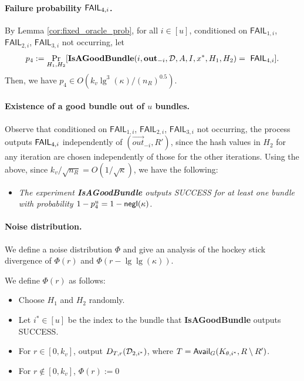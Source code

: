 \paragraph{Failure probability $\mathsf{FAIL}_{4,i}$.}
By Lemma \ref{cor:fixed_oracle_prob},
for all $i \in [u]$, 
conditioned on $\mathsf{FAIL}_{1,i}$, $\mathsf{FAIL}_{2,i}$, $\mathsf{FAIL}_{3,i}$ not occurring, let
\[
p_4 := \Pr_{H_1, H_2}[\textbf{IsAGoodBundle}(i, \mathbf{out}_{-i}, {\cal D}, A,
I, {x^*}, H_1, H_2)  =\  \mathsf{FAIL}_{4,i}]. \] 
Then, we have $p_4 \in O(k_v \lg^3(\kappa)/(n_R)^{0.5})$.

\paragraph{Existence of a good bundle out of $u$ bundles.}
Observe that conditioned on $\mathsf{FAIL}_{1,i}$,
$\mathsf{FAIL}_{2,i}$, $\mathsf{FAIL}_{3,i}$ not occurring, the process
outputs $\mathsf{FAIL}_{4,i}$ independently of $(\vec{out}_{-i}, R')$, since the
hash values in $H_2$ for any iteration are chosen independently of those
for the other iterations.
%
Using the above, since $k_v /\sqrt{n_R} = O(1/\sqrt{\kappa})$, we have the following:


\begin{itemize}
\item[] \it
The experiment {\bf IsAGoodBundle} outputs SUCCESS for at least one bundle with probability $1 - p_4^u = 1 - \mathsf{negl}(\kappa)$.
\end{itemize}

\paragraph{Noise distribution.}
We define a noise distribution
$\Phi$ and give an analysis of the hockey stick divergence of $\Phi(r)$ and $\Phi(r-\lg\lg(\kappa))$.

\begin{definition}
We define $\Phi(r)$ as follows:
\begin{itemize}
    \item Choose $H_1$ and $H_2$ randomly.  
    \item Let $i^* \in [u]$ be the index to the bundle that {\bf IsAGoodBundle} outputs SUCCESS.
    \item For $r \in [0, k_v]$,  output $D_{T, r}({\cal D}_{2,i^*})$, where $T = \mathsf{Avail}_G(K_{\theta, i^*}, R \setminus R')$.
    \item For $r \not \in [0, k_v]$, $\Phi(r) := 0$ 
\end{itemize}
\end{definition}

